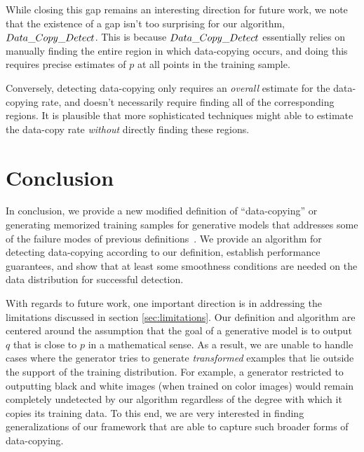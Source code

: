 While closing this gap remains an interesting direction for future work, we note that the existence of a gap isn't too surprising for our algorithm, $Data\_Copy\_Detect{}$. This is because $Data\_Copy\_Detect{}$ essentially relies on manually finding the entire region in which data-copying occurs, and doing this requires precise estimates of $p$ at all points in the training sample.  

Conversely, detecting data-copying only requires an \textit{overall} estimate for the data-copying rate, and doesn't necessarily require finding all of the corresponding regions. It is plausible that more sophisticated techniques might able to estimate the data-copy rate \textit{without} directly finding these regions.

\section{Conclusion}

In conclusion, we provide a new modified definition of ``data-copying'' or generating memorized training samples for generative models that addresses some of the failure modes of previous definitions~\cite{MCD2020}. We provide an algorithm for detecting data-copying according to our definition, establish performance guarantees, and show that at least some smoothness conditions are needed on the data distribution for successful detection. 

With regards to future work, one important direction is in addressing the limitations discussed in section \ref{sec:limitations}. Our definition and algorithm are centered around the assumption that the goal of a generative model is to output $q$ that is close to $p$ in a mathematical sense. As a result, we are unable to handle cases where the generator tries to generate \textit{transformed} examples that lie outside the support of the training distribution. For example, a generator restricted to outputting black and white images (when trained on color images) would remain completely undetected by our algorithm regardless of the degree with which it copies its training data. To this end, we are very interested in finding generalizations of our framework that are able to capture such broader forms of data-copying. 








%
%
%
%
%
%
%